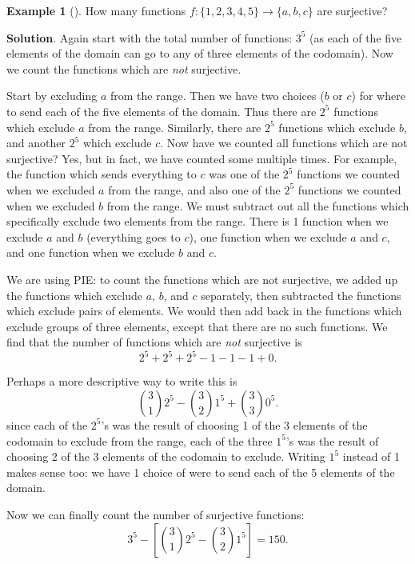 \documentclass[10pt,]{book}
\theoremstyle{plain}
\theoremstyle{definition}
\theoremstyle{definition}
\newtheorem{example}[theorem]{Example}
\theoremstyle{definition}
\theoremstyle{definition}
\numberwithin{equation}{chapter}
\begin{document}
\begin{example}[]\label{example-18}
\hypertarget{p-892}{}%
How many functions \(f: \{1,2,3,4,5\} \to \{a,b,c\}\) are surjective?%
\par\smallskip%
\noindent\textbf{Solution}.\hypertarget{solution-83}{}\quad%
\hypertarget{p-893}{}%
Again start with the total number of functions: \(3^5\) (as each of the five elements of the domain can go to any of three elements of the codomain). Now we count the functions which are \emph{not} surjective.%
\par
\hypertarget{p-894}{}%
Start by excluding \(a\) from the range. Then we have two choices (\(b\) or \(c\)) for where to send each of the five elements of the domain. Thus there are \(2^5\) functions which exclude \(a\) from the range. Similarly, there are \(2^5\) functions which exclude \(b\), and another \(2^5\) which exclude \(c\). Now have we counted all functions which are not surjective? Yes, but in fact, we have counted some multiple times. For example, the function which sends everything to \(c\) was one of the \(2^5\) functions we counted when we excluded \(a\) from the range, and also one of the \(2^5\) functions we counted when we excluded \(b\) from the range. We must subtract out all the functions which specifically exclude two elements from the range. There is 1 function when we exclude \(a\) and \(b\) (everything goes to \(c\)), one function when we exclude \(a\) and \(c\), and one function when we exclude \(b\) and \(c\).%
\par
\hypertarget{p-895}{}%
We are using PIE: to count the functions which are not surjective, we added up the functions which exclude \(a\), \(b\), and \(c\) separately, then subtracted the functions which exclude pairs of elements. We would then add back in the functions which exclude groups of three elements, except that there are no such functions. We find that the number of functions which are \emph{not} surjective is%
\begin{equation*}
2^5 + 2^5 + 2^5 - 1 - 1 - 1 + 0.
\end{equation*}
%
\par
\hypertarget{p-896}{}%
Perhaps a more descriptive way to write this is%
\begin{equation*}
{3 \choose 1}2^5 - {3 \choose 2}1^5 + {3 \choose 3}0^5.
\end{equation*}
since each of the \(2^5\)'s was the result of choosing 1 of the 3 elements of the codomain to exclude from the range, each of the three \(1^5\)'s was the result of choosing 2 of the 3 elements of the codomain to exclude. Writing \(1^5\) instead of 1 makes sense too: we have 1 choice of were to send each of the 5 elements of the domain.%
\par
\hypertarget{p-897}{}%
Now we can finally count the number of surjective functions:%
\begin{equation*}
3^5 - \left[{3 \choose 1}2^5 - {3 \choose 2}1^5\right] = 150.
\end{equation*}
%
\end{example}
\end{document}
